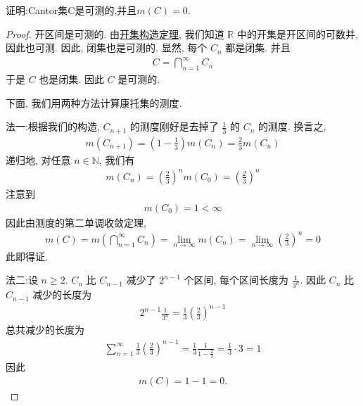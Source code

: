 \documentclass[../../main.tex]{subfiles}%
\begin{document}
\begin{proposition}\label{proposition:Cantor集可测且测度为0}
证明:Cantor集C是可测的,并且$m(C)=0$.
\end{proposition}
\begin{proof}

开区间是可测的. 由\hyperref[theorem:开集构造定理]{开集构造定理}, 我们知道 \(\mathbb{R}\) 中的开集是开区间的可数并, 因此也可测. 因此, 闭集也是可测的. 显然, 每个 \(C_n\) 都是闭集. 并且
\begin{align*}
C = \bigcap_{n = 1}^{\infty} C_n
\end{align*}
于是 \(C\) 也是闭集. 因此 \(C\) 是可测的.

下面, 我们用两种方法计算康托集的测度.

{\color{blue}法一:}根据我们的构造, \(C_{n + 1}\) 的测度刚好是去掉了 \(\frac{1}{3}\) 的 \(C_n\) 的测度. 换言之,
\begin{align*}
m(C_{n + 1}) = \left(1 - \frac{1}{3}\right)m(C_n) = \frac{2}{3}m(C_n)
\end{align*}
递归地, 对任意 \(n \in \mathbb{N}\), 我们有
\begin{align*}
m(C_n) = \left(\frac{2}{3}\right)^n m(C_0) = \left(\frac{2}{3}\right)^n
\end{align*}
注意到
\begin{align*}
m(C_0) = 1 < \infty
\end{align*}
因此由测度的第二单调收敛定理,
\begin{align*}
m(C) = m\left(\bigcap_{n = 1}^{\infty} C_n\right) = \lim_{n \to \infty} m(C_n) = \lim_{n \to \infty} \left(\frac{2}{3}\right)^n = 0
\end{align*}
此即得证.

{\color{blue}法二:}设 \(n \geqslant  2\). \(C_n\) 比 \(C_{n - 1}\) 减少了 \(2^{n - 1}\) 个区间, 每个区间长度为 \(\frac{1}{3^n}\). 因此 \(C_n\) 比 \(C_{n - 1}\) 减少的长度为
\begin{align*}
2^{n - 1}\frac{1}{3^n} = \frac{1}{3}\left(\frac{2}{3}\right)^{n - 1}
\end{align*}
总共减少的长度为
\begin{align*}
\sum_{n = 1}^{\infty} \frac{1}{3}\left(\frac{2}{3}\right)^{n - 1} = \frac{1}{3} \frac{1}{1 - \frac{2}{3}} = \frac{1}{3} \cdot 3 = 1
\end{align*}
因此
\begin{align*}
m(C) = 1 - 1 = 0.
\end{align*} 

\end{proof}
\end{document}

